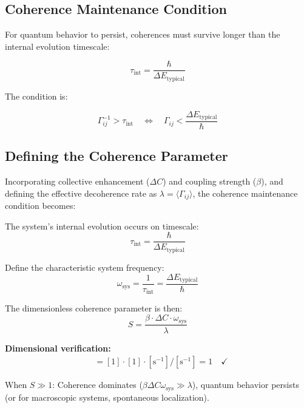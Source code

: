 \documentclass[12pt,a4paper]{article}
\begin{document}
\subsection{Coherence Maintenance Condition}

For quantum behavior to persist, coherences must survive longer than the internal evolution timescale:

\begin{equation}
\tau_{\text{int}} = \frac{\hbar}{\Delta E_{\text{typical}}}
\tag{S7}
\end{equation}

The condition is:

\begin{equation}
\Gamma_{ij}^{-1} > \tau_{\text{int}} \quad \Leftrightarrow \quad \Gamma_{ij} < \frac{\Delta E_{\text{typical}}}{\hbar}
\tag{S8}
\end{equation}

\subsection{Defining the Coherence Parameter}

Incorporating collective enhancement ($\Delta C$) and coupling strength ($\beta$), and defining the effective decoherence rate as $\lambda = \langle \Gamma_{ij} \rangle$, the coherence maintenance condition becomes:

The system's internal evolution occurs on timescale:
\begin{equation}
\tau_{\text{int}} = \frac{\hbar}{\Delta E_{\text{typical}}}
\tag{S7}
\end{equation}

Define the characteristic system frequency:
\begin{equation}
\omega_{\text{sys}} = \frac{1}{\tau_{\text{int}}} = \frac{\Delta E_{\text{typical}}}{\hbar}
\tag{S8}
\end{equation}

The dimensionless coherence parameter is then:
\begin{equation}
S = \frac{\beta \cdot \Delta C \cdot \omega_{\text{sys}}}{\lambda}
\tag{S9}
\end{equation}

\textbf{Dimensional verification:}
\begin{align}
[S] &= [1] \cdot [1] \cdot [\text{s}^{-1}] / [\text{s}^{-1}] = 1 \quad \checkmark \tag{S10}
\end{align}

When $S \gg 1$: Coherence dominates ($\beta \Delta C \omega_{\text{sys}} \gg \lambda$), quantum behavior persists (or for macroscopic systems, spontaneous localization).
\end{document}
